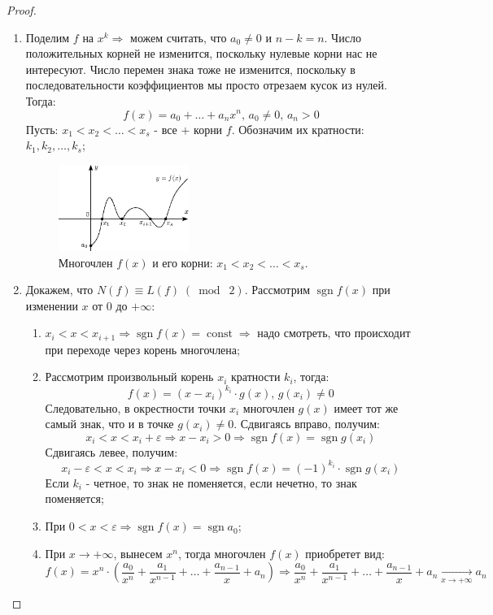 \documentclass[12pt]{article}
\newcommand{\VE}{\varepsilon}
\theoremstyle{definition}
\DeclareMathOperator{\sgn}{sgn}
\DeclareMathOperator{\const}{\text{const}}
\newcommand{\modn}[3]{#1 \equiv #2 \; (\bmod \; #3)}
\begin{document}
\begin{proof}
\begin{enumerate}[label=(\arabic*)]
		\item Поделим $f$ на $x^k \Rightarrow$ можем считать, что $a_0 \neq 0$ и $n - k = n$. Число положительных корней не изменится, поскольку нулевые корни нас не интересуют. Число перемен знака тоже не изменится, поскольку в последовательности коэффициентов мы просто отрезаем кусок из нулей. Тогда:
		$$
			f(x) = a_0 + \dotsc + a_{n}x^{n}, \, a_0 \neq 0, \, a_{n} > 0
		$$
		Пусть: $x_1 < x_2 < \dotsc < x_s$ - все $+$ корни $f$. Обозначим их кратности: $k_1, k_2,\dotsc, k_s$;
		\begin{figure}[H]
			\centering
			\includegraphics[width=0.4\textwidth]{AL1L19_3.eps}
			\caption{Многочлен $f(x)$ и его корни: $x_1 < x_2 < \dotsc < x_s$.}
			\label{19_3}
		\end{figure}
		\item Докажем, что $\modn{N(f)}{L(f)}{2}$. Рассмотрим $\sgn f(x)$ при изменении $x$ от $0$ до $+\infty$:
		\begin{enumerate}[label=\alph*)]
			\item $x_i < x < x_{i+1} \Rightarrow \sgn f(x) = \const \Rightarrow$ надо смотреть, что происходит при переходе через корень многочлена; 
			\item Рассмотрим произвольный корень $x_i$ кратности $k_i$, тогда:
			$$
				f(x) = (x - x_i)^{k_i}{\cdot}g(x), \, g(x_i) \neq 0
			$$
			Следовательно, в окрестности точки $x_i$ многочлен $g(x)$ имеет тот же самый знак, что и в точке $g(x_i) \neq 0$. Сдвигаясь вправо, получим:
			$$
				x_i < x < x_i + \VE \Rightarrow x - x_i > 0 \Rightarrow \sgn f(x) = \sgn g(x_i)
			$$
			Сдвигаясь левее, получим:
			$$
				x_i - \VE < x < x_i \Rightarrow x - x_i < 0 \Rightarrow \sgn f(x) = (-1)^{k_i}{\cdot}\sgn g(x_i)
			$$
			Если $k_i$ - четное, то знак не поменяется, если нечетно, то знак поменяется;
			\item При $0 < x < \VE \Rightarrow \sgn f(x) = \sgn a_0$;
			\item При $x \to +\infty$, вынесем $x^n$, тогда многочлен $f(x)$ приобретет вид:
			$$
				f(x) = x^n{\cdot}\left(\dfrac{a_0}{x^n} + \dfrac{a_1}{x^{n-1}} + \dotsc + \dfrac{a_{n-1}}{x} + a_n\right) \Rightarrow \dfrac{a_0}{x^n} + \dfrac{a_1}{x^{n-1}} + \dotsc + \dfrac{a_{n-1}}{x} + a_n \xrightarrow[x \to +\infty]{} a_n
$$
\end{enumerate}
\end{enumerate}
\end{proof}
\end{document}
